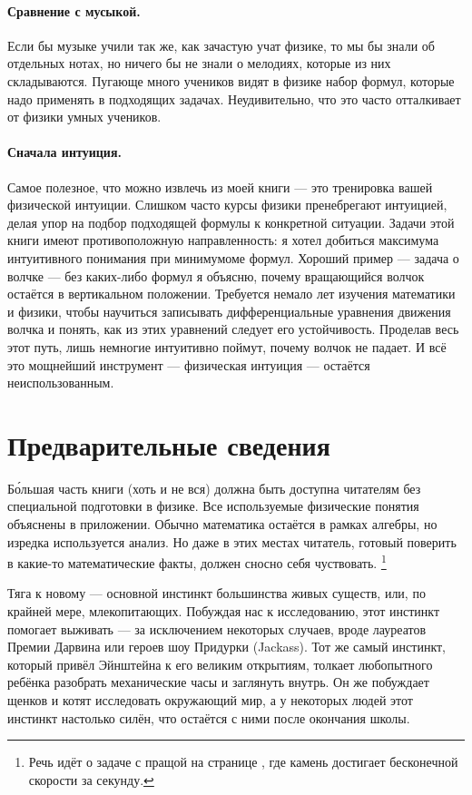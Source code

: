 \paragraph*{Сравнение с мусыкой.}
Если бы музыке учили так же, как зачастую учат физике, то мы бы знали об отдельных нотах, но ничего бы не знали о мелодиях, которые из них складываются.
Пугающе много учеников видят в физике набор формул, которые надо применять в подходящих задачах.
Неудивительно, что это часто отталкивает от физики умных учеников.

\paragraph*{Сначала интуиция.}
Самое полезное, что можно извлечь из моей книги --- это тренировка вашей физической интуиции.
Слишком часто курсы физики пренебрегают интуицией, делая упор на подбор подходящей формулы к конкретной ситуации.
Задачи этой книги имеют противоположную направленность:
я хотел добиться максимума интуитивного понимания при минимумоме формул.
Хороший пример --- задача о волчке --- без каких-либо формул я объясню, почему вращающийся волчок остаётся в вертикальном положении.
Требуется немало лет изучения математики и физики, чтобы научиться записывать дифференциальные уравнения движения волчка и понять, как из этих уравнений следует его устойчивость.
Проделав весь этот путь, лишь немногие интуитивно поймут, почему волчок не падает.
И всё это мощнейший инструмент --- физическая интуиция --- остаётся неиспользованным.

\section{Предварительные сведения}

Б\'{о}льшая часть книги (хоть и не вся) должна быть доступна читателям без специальной подготовки в физике.
Все используемые физические понятия объяснены в приложении.
Обычно математика остаётся в рамках алгебры, но изредка используется анализ.
Но даже в этих местах читатель, готовый поверить в какие-то математические факты, должен сносно себя чуствовать.%
\footnote{Речь идёт о задаче с пращой на странице \pageref{???}, где камень достигает бесконечной скорости за секунду.}

Тяга к новому — основной инстинкт большинства живых существ, или, по крайней мере, млекопитающих.
Побуждая нас к исследованию, этот инстинкт помогает выживать — за исключением некоторых случаев, вроде лауреатов Премии Дарвина или героев шоу Придурки (Jackass).
Тот же самый инстинкт, который привёл Эйнштейна к его великим открытиям, толкает любопытного ребёнка разобрать механические часы и заглянуть внутрь.
Он же побуждает щенков и котят исследовать окружающий мир,
а у некоторых людей этот инстинкт настолько силён, что остаётся с ними после окончания школы.

